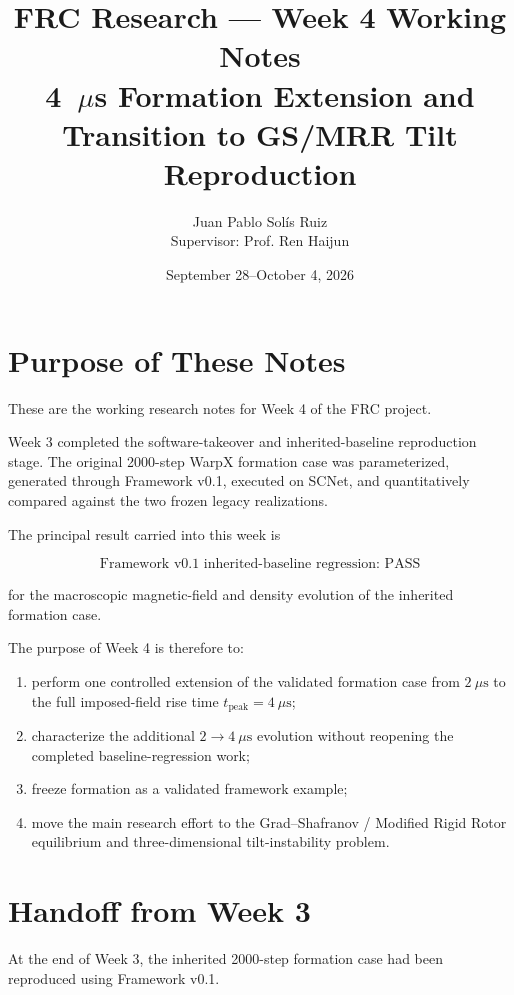 \documentclass[11pt,a4paper]{article}
\title{\textbf{FRC Research --- Week 4 Working Notes}\\
\large 4~$\mu$s Formation Extension and Transition to GS/MRR Tilt Reproduction}
\author{Juan Pablo Solís Ruiz\\
Supervisor: Prof. Ren Haijun}
\date{September 28--October 4, 2026}
\begin{document}
\maketitle
\tableofcontents
\newpage

\section{Purpose of These Notes}

These are the working research notes for Week 4 of the FRC project.

Week 3 completed the software-takeover and inherited-baseline reproduction
stage. The original 2000-step WarpX formation case was parameterized,
generated through Framework v0.1, executed on SCNet, and quantitatively
compared against the two frozen legacy realizations.

The principal result carried into this week is

\[
\boxed{
\text{Framework v0.1 inherited-baseline regression: PASS}
}
\]

for the macroscopic magnetic-field and density evolution of the inherited
formation case.

The purpose of Week 4 is therefore to:

\begin{enumerate}
    \item perform one controlled extension of the validated formation case
    from \(2~\mu\mathrm{s}\) to the full imposed-field rise time
    \(t_{\mathrm{peak}}=4~\mu\mathrm{s}\);
    \item characterize the additional \(2\rightarrow4~\mu\mathrm{s}\)
    evolution without reopening the completed baseline-regression work;
    \item freeze formation as a validated framework example;
    \item move the main research effort to the Grad--Shafranov / Modified
    Rigid Rotor equilibrium and three-dimensional tilt-instability problem.
\end{enumerate}

\section{Handoff from Week 3}

At the end of Week 3, the inherited 2000-step formation case had been
reproduced using Framework v0.1.
\end{document}
